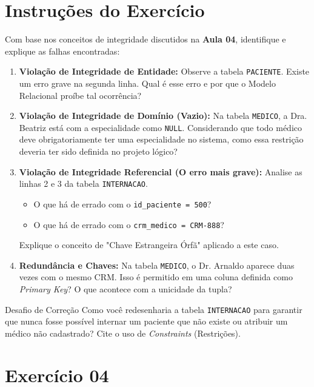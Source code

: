 \documentclass[12pt]{article}
\begin{document}
\section*{Instruções do Exercício}

Com base nos conceitos de integridade discutidos na \textbf{Aula 04}, identifique e explique as falhas encontradas:

\begin{enumerate}[label=\alph*)]
    \item \textbf{Violação de Integridade de Entidade:} Observe a tabela \texttt{PACIENTE}. Existe um erro grave na segunda linha. Qual é esse erro e por que o Modelo Relacional proíbe tal ocorrência?
    
    \item \textbf{Violação de Integridade de Domínio (Vazio):} Na tabela \texttt{MEDICO}, a Dra. Beatriz está com a especialidade como \texttt{NULL}. Considerando que todo médico deve obrigatoriamente ter uma especialidade no sistema, como essa restrição deveria ter sido definida no projeto lógico?
    
    \item \textbf{Violação de Integridade Referencial (O erro mais grave):} Analise as linhas 2 e 3 da tabela \texttt{INTERNACAO}.
    \begin{itemize}
        \item O que há de errado com o \texttt{id\_paciente = 500}?
        \item O que há de errado com o \texttt{crm\_medico = CRM-888}?
    \end{itemize}
    Explique o conceito de "Chave Estrangeira Órfã" aplicado a este caso.
    
    \item \textbf{Redundância e Chaves:} Na tabela \texttt{MEDICO}, o Dr. Arnaldo aparece duas vezes com o mesmo CRM. Isso é permitido em uma coluna definida como \textit{Primary Key}? O que acontece com a unicidade da tupla?
\end{enumerate}

\begin{block}{Desafio de Correção}
Como você redesenharia a tabela \texttt{INTERNACAO} para garantir que nunca fosse possível internar um paciente que não existe ou atribuir um médico não cadastrado? Cite o uso de \textit{Constraints} (Restrições).
\end{block}


\section*{Exercício 04}
\end{document}
